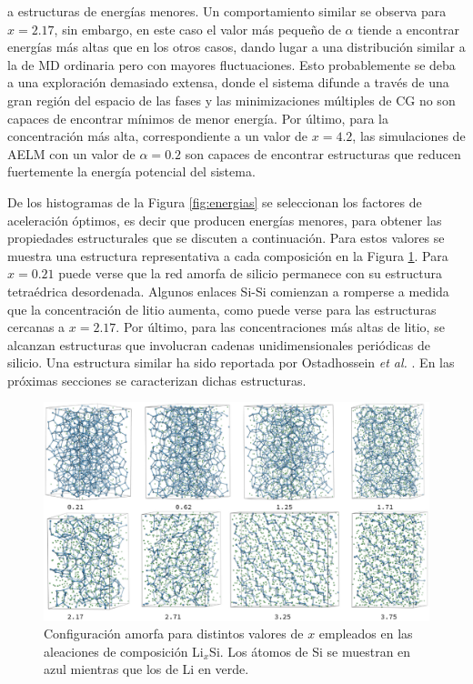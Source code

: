 a estructuras de energías menores. Un comportamiento similar se observa para 
$x = 2.17$, sin embargo, en este caso el valor más pequeño de $\alpha$ tiende a 
encontrar energías más altas que en los otros casos, dando lugar a una distribución
similar a la de MD ordinaria pero con mayores fluctuaciones. Esto probablemente 
se deba a una exploración demasiado extensa, donde el sistema difunde a través
de una gran región del espacio de las fases y las minimizaciones múltiples de 
CG no son capaces de encontrar mínimos de menor energía. Por último, para la 
concentración más alta, correspondiente a un valor de $x = 4.2$, las simulaciones 
de AELM con un valor de $\alpha = 0.2$ son capaces de encontrar estructuras que 
reducen fuertemente la energía potencial del sistema. 

De los histogramas de la Figura \ref{fig:energias} se seleccionan los factores 
de aceleración óptimos, es decir que producen energías menores, para obtener
las propiedades estructurales que se discuten a continuación. Para estos valores
se muestra una estructura representativa a cada composición en la Figura 
\ref{fig:amorfas}. Para $x = 0.21$ puede verse que la red amorfa de silicio
permanece con su estructura tetraédrica desordenada. Algunos enlaces Si-Si 
comienzan a romperse a medida que la concentración de litio aumenta, como puede
verse para las estructuras cercanas a $x = 2.17$. Por último, para las 
concentraciones más altas de litio, se alcanzan estructuras que involucran 
cadenas unidimensionales periódicas de silicio. Una estructura similar ha sido 
reportada por Ostadhossein \textit{et al.} \cite{ostadhossein2015}. En las 
próximas secciones se caracterizan dichas estructuras.
\begin{figure}[h!]
    \centering
    \includegraphics[width=\textwidth]{Silicio/caracterizacion/resultados/introduccion/amorfas.png}
    \caption{Configuración amorfa para distintos valores de $x$ empleados en las
    aleaciones de composición Li$_x$Si. Los átomos de Si se muestran en azul 
    mientras que los de Li en verde.}
    \label{fig:amorfas}
\end{figure}

\


